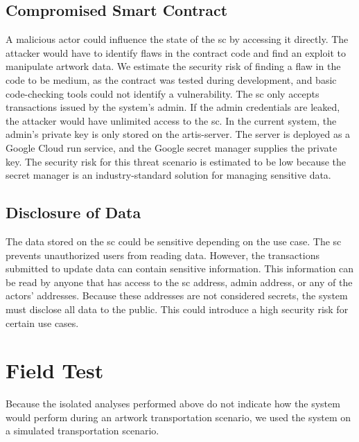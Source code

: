 \subsection{Compromised Smart Contract}
A malicious actor could influence the state of the \gls{sc} by accessing it directly. The attacker would have to identify flaws in the contract code and find an exploit to manipulate artwork data. We estimate the security risk of finding a flaw in the code to be medium, as the contract was tested during development, and basic code-checking tools could not identify a vulnerability. The \gls{sc} only accepts transactions issued by the system's admin. If the admin credentials are leaked, the attacker would have unlimited access to the \gls{sc}. In the current system, the admin's private key is only stored on the artis-server. The server is deployed as a Google Cloud run service, and the Google secret manager supplies the private key. The security risk for this threat scenario is estimated to be low because the secret manager is an industry-standard solution for managing sensitive data.

\subsection{Disclosure of Data}
The data stored on the \gls{sc} could be sensitive depending on the use case. The \gls{sc} prevents unauthorized users from reading data. However, the transactions submitted to update data can contain sensitive information. This information can be read by anyone that has access to the \gls{sc} address, admin address, or any of the actors' addresses. Because these addresses are not considered secrets, the system must disclose all data to the public. This could introduce a high security risk for certain use cases.

\section{Field Test}
\label{sec:field_test}
Because the isolated analyses performed above do not indicate how the system would perform during an artwork transportation scenario, we used the system on a simulated transportation scenario.

